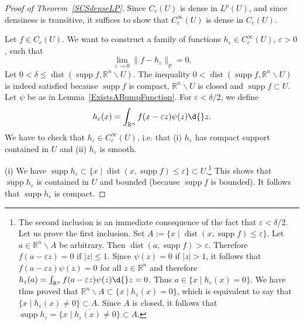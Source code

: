 \documentclass[12pt, oneside, a4paper]{article}
\def\supp{\operatorname{supp}}
\def\dist{\operatorname{dist}}
\theoremstyle{dfn}
\def\Rbb{\ensuremath{\mathbb{R}}}
\providecommand{\norm}[1]{\lVert#1\rVert}
\providecommand{\abs}[1]{\lvert#1\rvert}
\begin{document}
\begin{proof}[Proof of Theorem~\ref{SCSdenseLP}]
Since $C_c(U)$ is dense in $L^p(U)$, and since densiness is transitive, it suffices to show that $C_c^\infty(U)$ is dense in $C_c(U)$.

Let $f \in C_c(U)$. We want to construct a family of functions $h_\varepsilon \in C_c^\infty(U)$, $\varepsilon > 0$, such that
\[
\lim_{\varepsilon \to 0} \norm{f - h_\varepsilon}_p = 0.
\]
Let $0 < \delta \leqslant \dist(\supp f, \Rbb^n \smallsetminus U)$. The inequality $0 < \dist(\supp f, \Rbb^n \smallsetminus U)$ is indeed satisfied because $\supp f$ is compact, $\Rbb^n \smallsetminus U$ is closed and $\supp f \subset U$. Let $\psi$ be as in Lemma~\ref{ExistsABumpFunction}. For $\varepsilon < \delta/2$, we define
\[
h_\varepsilon(x) = \int_{\Rbb^n} f(x - \varepsilon z) \psi(z) \d{}z.
\]
We have to check that $h_\varepsilon \in C_c^\infty(U)$, i.e. that (i) $h_\varepsilon$ has compact support contained in $U$ and (ii) $h_\varepsilon$ is smooth.

(i) We have
$
\supp h_\varepsilon \subset \{ x \mid \dist(x, \supp f) \leqslant \varepsilon\} \subset U
$.\footnote{%
The second inclusion is an immediate consequence of the fact that $\varepsilon < \delta/2$. Let us prove the first inclusion. Set $A:=  \{ x \mid \dist(x, \supp f) \leqslant \varepsilon\}$. Let $a \in \Rbb^n \smallsetminus A$ be arbitrary. Then $\dist(a,\supp f) > \varepsilon$. Therefore $f(a - \varepsilon z) = 0$ if $\abs{z} \leqslant 1$. Since $\psi(z) = 0$ if $\abs{z} > 1$, it follows that $f(a - \varepsilon z) \psi(z) = 0$ for all $z \in \Rbb^n$ and therefore $h_\varepsilon(a) = \int_{\Rbb^n} f(a - \varepsilon z) \psi(z) \d{}z = 0$. Thus $a \in \{x \mid h_\varepsilon(x) =0\}$. We have thus proved that $\Rbb^n \smallsetminus A \subset \{x \mid h_\varepsilon(x) =0\}$, which is equivalent to say that $\{x \mid h_\varepsilon(x) \neq 0\} \subset A$. Since $A$ is closed, it follows that $\supp h_\varepsilon = \overline{\{x \mid h_\varepsilon(x) \neq 0\}} \subset A$.
}
This shows that $\supp h_\varepsilon$ is contained in $U$ and bounded (because $\supp f$ is bounded). It follows that $\supp h_\varepsilon$ is compact.%


\end{proof}
\end{document}
